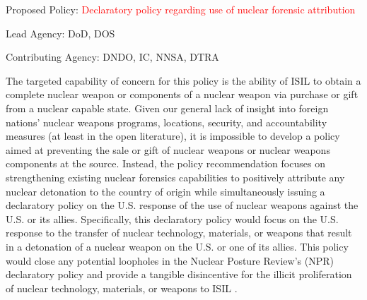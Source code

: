 \documentclass{report}
\begin{document}
Proposed Policy: \textcolor{red}{Declaratory policy regarding use of nuclear forensic attribution}

Lead Agency: DoD, DOS

Contributing Agency: DNDO, IC, NNSA, DTRA \normalfont

The targeted capability of concern for this policy is the ability of ISIL to obtain a complete nuclear weapon or components of a nuclear weapon via purchase or gift from a nuclear capable state.  Given our general lack of insight into foreign nations' nuclear weapons programs, locations, security, and accountability measures (at least in the open literature), it is impossible to develop a policy aimed at preventing the sale or gift of nuclear weapons or nuclear weapons components at the source.  Instead, the policy recommendation focuses on strengthening existing nuclear forensics capabilities to positively attribute any nuclear detonation to the country of origin while simultaneously issuing a declaratory policy on the U.S. response of the use of nuclear weapons against the U.S. or its allies.  Specifically, this declaratory policy would focus on the U.S. response to the transfer of nuclear technology, materials, or weapons that result in a detonation of a nuclear weapon on the U.S. or one of its allies.  This policy would close any potential loopholes in the Nuclear Posture Review's (NPR) declaratory policy and provide a tangible disincentive for the illicit proliferation of nuclear technology, materials, or weapons to ISIL \cite{U.S.DepartmentofDefense2010}.  
\end{document}
